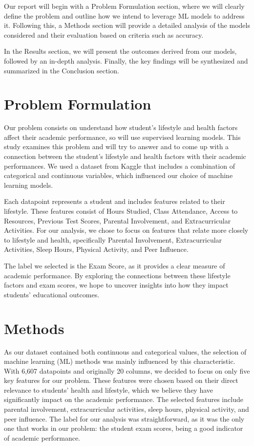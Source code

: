 \documentclass[titlepage]{article}
\begin{document}
Our report will begin with a Problem Formulation section, where we will clearly define the problem and outline how we intend to leverage ML models to address it. Following this, a Methods section will provide a detailed analysis of the models considered and their evaluation based on criteria such as accuracy.

In the Results section, we will present the outcomes derived from our models, followed by an in-depth analysis. Finally, the key findings will be synthesized and summarized in the Conclusion section.

\section{Problem Formulation}
\quad Our problem consists on understand how student's lifestyle and health factors affect their academic performance, so will use supervised learning models.
This study examines this problem and will try to answer and to come up with a connection between the student's lifestyle and health factors with their academic performances. We used a dataset from Kaggle \cite{Kaggle_dataset} that includes a combination of categorical and continuous variables, which influenced our choice of machine learning models.


Each datapoint represents a student and includes features related to their lifestyle. These features consist of Hours Studied, Class Attendance, Access to Resources, Previous Test Scores, Parental Involvement, and Extracurricular Activities. For our analysis, we chose to focus on features that relate more closely to lifestyle and health, specifically Parental Involvement, Extracurricular Activities, Sleep Hours, Physical Activity, and Peer Influence.

The label we selected is the Exam Score, as it provides a clear measure of academic performance. By exploring the connections between these lifestyle factors and exam scores, we hope to uncover insights into how they impact students’ educational outcomes.

\section{Methods}

\quad As our dataset contained both continuous and categorical values, the selection of machine learning (ML) methods was mainly influenced by this characteristic. With 6,607 datapoints and originally 20 columns, we decided to focus on only five key features for our problem. These features were chosen based on their direct relevance to students' health and lifestyle, which we believe they have significantly impact on the academic performance. The selected features include parental involvement, extracurricular activities, sleep hours, physical activity, and peer influence. The label for our analysis was straightforward, as it was the only one that works in our problem: the student exam scores, being a good indicator of academic performance.
\end{document}
